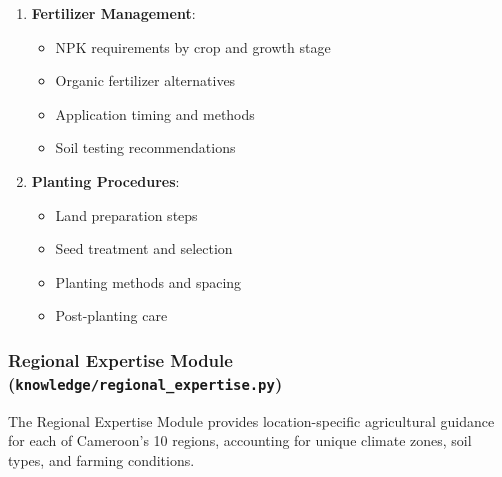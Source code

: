 \documentclass[12pt,a4paper]{article}
\begin{document}
\begin{enumerate}[leftmargin=*]
    \item \textbf{Fertilizer Management}:
    \begin{itemize}
        \item NPK requirements by crop and growth stage
        \item Organic fertilizer alternatives
        \item Application timing and methods
        \item Soil testing recommendations
    \end{itemize}

    \item \textbf{Planting Procedures}:
    \begin{itemize}
        \item Land preparation steps
        \item Seed treatment and selection
        \item Planting methods and spacing
        \item Post-planting care
    \end{itemize}
\end{enumerate}

\subsubsection{Regional Expertise Module (\texttt{knowledge/regional\_expertise.py})}

The Regional Expertise Module provides location-specific agricultural guidance for each of Cameroon's 10 regions, accounting for unique climate zones, soil types, and farming conditions.
\end{document}
